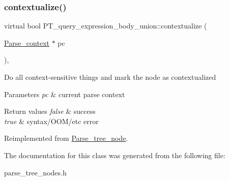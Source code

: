 \subsubsection{\texorpdfstring{contextualize()}{contextualize()}}
{\footnotesize\ttfamily virtual bool P\+T\+\_\+query\+\_\+expression\+\_\+body\+\_\+union\+::contextualize (\begin{DoxyParamCaption}\item[{\mbox{\hyperlink{structParse__context}{Parse\+\_\+context}} $\ast$}]{pc }\end{DoxyParamCaption})\hspace{0.3cm}{\ttfamily [inline]}, {\ttfamily [virtual]}}

Do all context-\/sensitive things and mark the node as contextualized


\begin{DoxyParams}{Parameters}
{\em pc} & current parse context\\
\hline
\end{DoxyParams}

\begin{DoxyRetVals}{Return values}
{\em false} & success \\
\hline
{\em true} & syntax/\+O\+O\+M/etc error \\
\hline
\end{DoxyRetVals}


Reimplemented from \mbox{\hyperlink{classParse__tree__node_a22d93524a537d0df652d7efa144f23da}{Parse\+\_\+tree\+\_\+node}}.



The documentation for this class was generated from the following file\+:\begin{DoxyCompactItemize}
\item 
parse\+\_\+tree\+\_\+nodes.\+h\end{DoxyCompactItemize}
